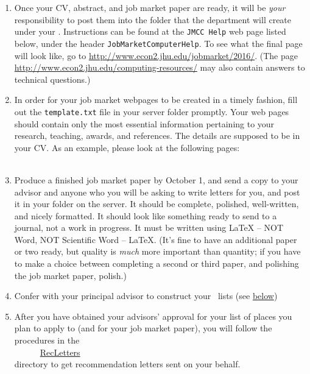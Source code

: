\documentclass{\classes/econtex}
\begin{document}
\begin{enumerate}
  \hypertarget{Post-To-Server}{}
\item Once your CV, abstract, and job market paper are ready, it will
  be \textit{your} responsibility to post them into the folder that
  the department will create under your \Moniker.
  Instructions can be found at the \texttt{JMCC Help} web page listed
  below, under the header \texttt{JobMarketComputerHelp}.  To see what
  the final page will look like, go to
  \url{http://www.econ2.jhu.edu/jobmarket/2016/}.  (The page
  \url{http://www.econ2.jhu.edu/computing-resources/}
  may also contain answers to technical questions.)
  
  \hypertarget{Template}{}
\item In order for your job market webpages to be created in a timely fashion, 
  fill out the \texttt{template.txt} file in your server folder promptly.
  Your web pages should contain only the most essential information 
  pertaining to your research, teaching, awards, and references. 
  The details are supposed to be in your CV.
  As an example, please look at the following pages:\\
  \\
  

  \hypertarget{Produce-Job-Paper}{}
\item Produce a finished job market paper by October 1, and send a copy to your advisor and anyone who you will be asking to write letters for you, and post it in your folder on the server.  It should be complete, polished, well-written, and nicely formatted.  It should look like something ready to send to a journal, not a work in progress.  It must be written using {\LaTeX} -- NOT Word, NOT Scientific Word -- {\LaTeX}.  (It's fine to have an additional paper or two ready, but quality is \textit{much} more important than quantity; if you have to make a choice between completing a second or third paper, and polishing the job market paper, polish.)
  
  \hypertarget{\EM}{}
\item Confer with your principal advisor to construct your~{\EMtt} lists (see \hyperlink{below}{below})

  
  \hypertarget{Rec-Letters}{}
\item After you have obtained your advisors' approval for your list of
  places you plan to apply to (and for your job market paper), you
  will follow the procedures in the \\
  ~~~~~~\href{\bloburl/RecLetters}{RecLetters} \\
  directory to get recommendation letters sent on your behalf.


\end{enumerate}
\end{document}
